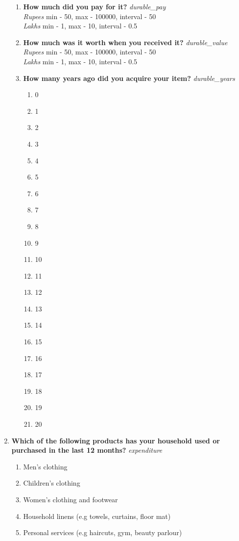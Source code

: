\documentclass{article}
\begin{document}
\begin{enumerate}
\begin{enumerate}[label*=\arabic*.]
\item {\bfseries How much did you pay for it?}\emph{ durable\_pay }
\\ \emph{ Rupees }min - 50, max - 100000, interval - 50
\\ \emph{ Lakhs }min - 1, max - 10, interval - 0.5

\item {\bfseries How much was it worth when you received it?}\emph{ durable\_value }
\\ \emph{ Rupees }min - 50, max - 100000, interval - 50
\\ \emph{ Lakhs }min - 1, max - 10, interval - 0.5

\item {\bfseries How many years ago did you acquire your item?}\emph{ durable\_years }
\begin{enumerate}
\item 0
\item 1
\item 2
\item 3
\item 4
\item 5
\item 6
\item 7
\item 8
\item 9
\item 10
\item 11
\item 12
\item 13
\item 14
\item 15
\item 16
\item 17
\item 18
\item 19
\item 20
\end{enumerate}
\end{enumerate}
\item {\bfseries Which of the following products has your household used or purchased in the last 12 months? }\emph{ expenditure }
\begin{enumerate}
\item Men's clothing
\item Children's clothing
\item Women's clothing and footwear
\item Household linens (e.g towels, curtains, floor mat)
\item Personal services (e.g haircuts, gym, beauty parlour)

\end{enumerate}
\end{enumerate}
\end{document}
